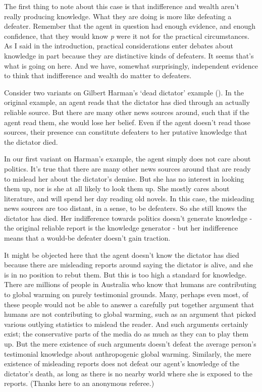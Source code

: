 \documentclass[
  11pt,
  letterpaper,
  DIV=11,
  numbers=noendperiod,
  twoside]{scrartcl}
\begin{document}
The first thing to note about this case is that indifference and wealth
aren't really producing knowledge. What they are doing is more like
defeating a defeater. Remember that the agent in question had enough
evidence, and enough confidence, that they would know \emph{p} were it
not for the practical circumstances. As I said in the introduction,
practical considerations enter debates about knowledge in part because
they are distinctive kinds of defeaters. It seems that's what is going
on here. And we have, somewhat surprisingly, independent evidence to
think that indifference and wealth do matter to defeaters.

Consider two variants on Gilbert Harman's `dead dictator' example
(). In the original example,
an agent reads that the dictator has died through an actually reliable
source. But there are many other news sources around, such that if the
agent read them, she would lose her belief. Even if the agent doesn't
read those sources, their presence can constitute defeaters to her
putative knowledge that the dictator died.

In our first variant on Harman's example, the agent simply does not care
about politics. It's true that there are many other news sources around
that are ready to mislead her about the dictator's demise. But she has
no interest in looking them up, nor is she at all likely to look them
up. She mostly cares about literature, and will spend her day reading
old novels. In this case, the misleading news sources are too distant,
in a sense, to be defeaters. So she still knows the dictator has died.
Her indifference towards politics doesn't generate knowledge - the
original reliable report is the knowledge generator - but her
indifference means that a would-be defeater doesn't gain traction.

It might be objected here that the agent doesn't know the dictator has
died because there are misleading reports around saying the dictator is
alive, and she is in no position to rebut them. But this is too high a
standard for knowledge. There are millions of people in Australia who
know that humans are contributing to global warming on purely
testimonial grounds. Many, perhaps even most, of these people would not
be able to answer a carefully put together argument that humans are not
contributing to global warming, such as an argument that picked various
outlying statistics to mislead the reader. And such arguments certainly
exist; the conservative parts of the media do as much as they can to
play them up. But the mere existence of such arguments doesn't defeat
the average person's testimonial knowledge about anthropogenic global
warming. Similarly, the mere existence of misleading reports does not
defeat our agent's knowledge of the dictator's death, as long as there
is no nearby world where she is exposed to the reports. (Thanks here to
an anonymous referee.)
\end{document}
